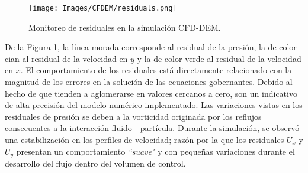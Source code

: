 \begin{figure}[h!]
	\centering
	\texttt{[image: Images/CFDEM/residuals.png]}
	\caption{Monitoreo de residuales en la simulaci\'on CFD-DEM.}
	\label{CFDEM:residuals}
\end{figure}

\noindent
\justify

De la Figura \ref{CFDEM:residuals}, la l\'inea morada corresponde al residual de la presi\'on, la de color cian al residual de la velocidad en $y$ y la de color verde al residual de la velocidad en $x$. El comportamiento de los residuales est\'a directamente relacionado con la magnitud de los errores en la soluci\'on de las ecuaciones gobernantes. Debido al hecho de que tienden a aglomerarse en valores cercanos a cero, son un indicativo de alta precisi\'on del modelo num\'erico implementado. Las variaciones vistas en los residuales de presi\'on se deben a la vorticidad originada por los reflujos consecuentes a la interacci\'on fluido - part\'icula. Durante la simulaci\'on, se observ\'o una estabilizaci\'on en los perfiles de velocidad; raz\'on por la que los residuales $U_x$ y $U_y$ presentan un comportamiento \textit{``suave"} y con peque\~nas variaciones durante el desarrollo del flujo dentro del volumen de control.